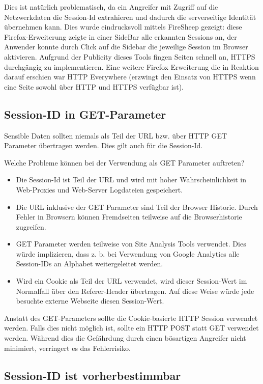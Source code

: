 Dies ist natürlich problematisch, da ein Angreifer mit Zugriff auf die Netzwerkdaten die Session-Id extrahieren und dadurch die serverseitige Identität übernehmen kann. Dies wurde eindrucksvoll mittels FireSheep gezeigt: diese Firefox-Erweiterung zeigte in einer SideBar alle erkannten Sessions an, der Anwender konnte durch Click auf die Sidebar die jeweilige Session im Browser aktivieren. Aufgrund der Publicity dieses Tools fingen Seiten schnell an, HTTPS durchgängig zu implementieren. Eine weitere Firefox Erweiterung die in Reaktion darauf erschien war HTTP Everywhere (erzwingt den Einsatz von HTTPS wenn eine Seite sowohl über HTTP und HTTPS verfügbar ist).


\subsection{Session-ID in GET-Parameter}

Sensible Daten sollten niemals als Teil der URL bzw. über HTTP GET Parameter übertragen werden. Dies gilt auch für die Session-Id.

Welche Probleme können bei der Verwendung als GET Parameter auftreten?

\begin{itemize}
	\item Die Session-Id ist Teil der URL und wird mit hoher Wahrscheinlichkeit in Web-Proxies und Web-Server Logdateien gespeichert.
	\item Die URL inklusive der GET Parameter sind Teil der Browser Historie. Durch Fehler in Browsern können Fremdseiten teilweise auf die Browserhistorie zugreifen.
	\item GET Parameter werden teilweise von Site Analysis Tools verwendet. Dies würde implizieren, dass z. b. bei Verwendung von Google Analytics alle Session-IDs an Alphabet weitergeleitet werden.
	\item Wird ein Cookie als Teil der URL verwendet, wird dieser Session-Wert im Normalfall über den Referer-Header übertragen. Auf diese Weise würde jede besuchte externe Webseite diesen Session-Wert.
\end{itemize}

Anstatt des GET-Parameters sollte die Cookie-basierte HTTP Session verwendet werden. Falls dies nicht möglich ist, sollte ein HTTP POST statt GET verwendet werden. Während dies die Gefährdung durch einen bösartigen Angreifer nicht minimiert, verringert es das Fehlerrisiko.

\subsection{Session-ID ist vorherbestimmbar}

